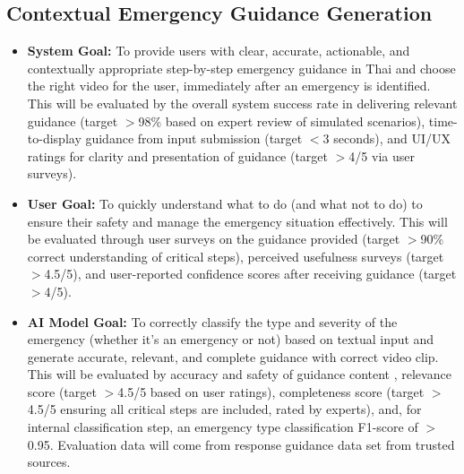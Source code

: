 \subsection{Contextual Emergency Guidance Generation}
\label{subsec:goal_guidance_generation}
\begin{itemize}
    \item \textbf{System Goal:} To provide users with clear, accurate, actionable, and contextually appropriate step-by-step emergency guidance in Thai and choose the right video for the user, immediately after an emergency is identified. This will be evaluated by the overall system success rate in delivering relevant guidance (target $>$98\% based on expert review of simulated scenarios), time-to-display guidance from input submission (target $<$3 seconds), and UI/UX ratings for clarity and presentation of guidance (target $>$4/5 via user surveys).
    \item \textbf{User Goal:} To quickly understand what to do (and what not to do) to ensure their safety and manage the emergency situation effectively. This will be evaluated through user surveys on the guidance provided (target $>$90\% correct understanding of critical steps), perceived usefulness surveys (target $>$4.5/5), and user-reported confidence scores after receiving guidance (target $>$4/5).
    \item \textbf{AI Model Goal:} To correctly classify the type and severity of the emergency (whether it’s an emergency or not) based on textual input and generate accurate, relevant, and complete guidance with correct video clip. This will be evaluated by accuracy and safety of guidance content , relevance score (target $>$4.5/5 based on user ratings), completeness score (target $>$4.5/5 ensuring all critical steps are included, rated by experts), and, for internal classification step, an emergency type classification F1-score of $>$0.95. Evaluation data will come from response guidance data set from trusted sources.
\end{itemize}


